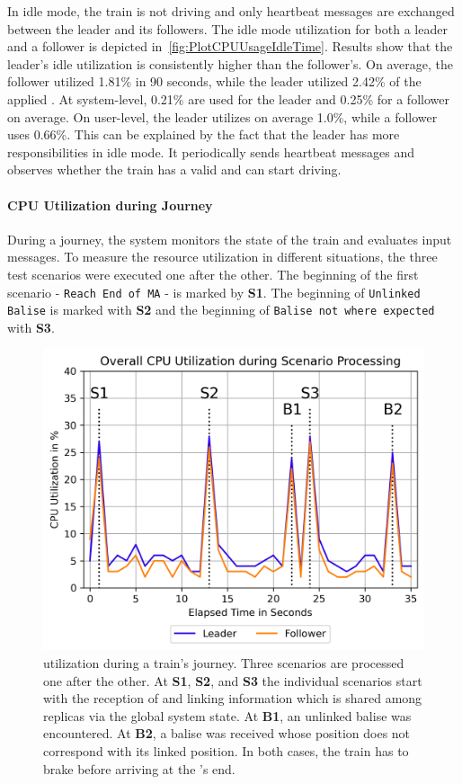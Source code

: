 In idle mode, the train is not driving and only heartbeat messages are exchanged between the leader and its followers.
The idle mode  utilization for both a leader and a follower is depicted in~\autoref{fig:PlotCPUUsageIdleTime}.
Results show that the leader's idle  utilization is consistently higher than the follower's.
On average, the follower utilized 1.81\% in 90 seconds, while the leader utilized 2.42\% of the applied .
At system-level, 0.21\% are used for the leader and 0.25\% for a follower on average.
On user-level, the leader utilizes on average 1.0\%, while a follower uses 0.66\%.
This can be explained by the fact that the leader has more responsibilities in idle mode.
It periodically sends heartbeat messages and observes whether the train has a valid  and can start driving.


\paragraph{CPU Utilization during Journey}

During a journey, the system monitors the state of the train and evaluates input messages.
To measure the resource utilization in different situations, the three test scenarios were executed one after the other.
The beginning of the first scenario - \texttt{Reach End of MA} - is marked by \textbf{S1}.
The beginning of \texttt{Unlinked Balise} is marked with \textbf{S2} and the beginning of \texttt{Balise not where expected} with \textbf{S3}.

\begin{figure}[!htb]
	\centering
	\includegraphics[width=0.8\linewidth]{images/plots/TotalCPUUsage}
	\caption{ utilization during a train's journey. Three scenarios are processed one after the other. At \textbf{S1}, \textbf{S2}, and \textbf{S3} the individual scenarios start with the reception of  and linking information which is shared among replicas via the global system state. At \textbf{B1}, an unlinked balise was encountered. At \textbf{B2}, a balise was received whose position does not correspond with its linked position. In both cases, the train has to brake before arriving at the 's end.}
	\label{fig:PlotTotalCPUUsage}
\end{figure}

